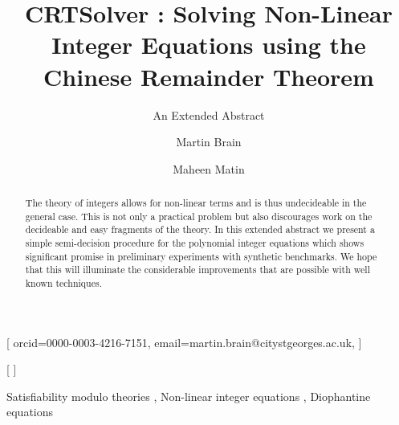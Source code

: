 \documentclass[
]{ceurart}
\begin{document}


\title{CRTSolver : Solving Non-Linear Integer Equations using the Chinese Remainder Theorem}
\subtitle{An Extended Abstract}


\author[1]{Martin Brain}[%
orcid=0000-0003-4216-7151,
email=martin.brain@citystgeorges.ac.uk,
]
\address[1]{City St. George's, University of London,
  Northampton Square, London, EC1V 0HB, United Kingdom}

\author[2]{Maheen Matin}[%
]



\begin{abstract}
 The theory of integers allows for non-linear terms and is thus
 undecideable in the general case.
 This is not only a practical problem but also discourages work on
 the decideable and easy fragments of the theory.
 In this extended abstract we present a simple semi-decision procedure
 for the polynomial integer equations which shows significant promise
 in preliminary experiments with synthetic benchmarks.
 We hope that this will illuminate the considerable improvements that
 are possible with well known techniques.
\end{abstract}

\begin{keywords}
  Satisfiability modulo theories \sep
  Non-linear integer equations \sep
  Diophantine equations
\end{keywords}

\maketitle
{}
\end{document}
